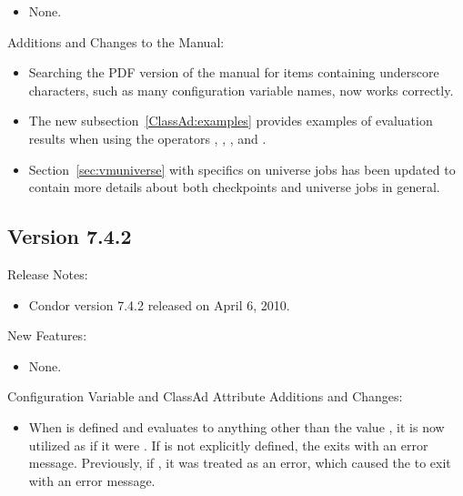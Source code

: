 \begin{itemize}

\item None.

\end{itemize}

\noindent Additions and Changes to the Manual:

\begin{itemize}

\item Searching the PDF version of the manual for items containing 
underscore characters, such as many configuration variable names,
now works correctly.

\item The new subsection~\ref{ClassAd:examples} provides examples of
evaluation results when using the operators \Expr{==}, ,
\Expr{!=}, and \Expr{=!=}.

\item Section~\ref{sec:vmuniverse} with specifics on 
universe jobs has been updated to contain more details about
both checkpoints and  universe jobs in general.

\end{itemize}


\subsection*{\label{sec:New-7-4-2}Version 7.4.2}

\noindent Release Notes:

\begin{itemize}

\item Condor version 7.4.2 released on April 6, 2010.

\end{itemize}


\noindent New Features:

\begin{itemize}

\item None.

\end{itemize}

\noindent Configuration Variable and ClassAd Attribute Additions and Changes:

\begin{itemize}

\item When  is defined and evaluates to anything
other than the value ,
it is now utilized as if it were .
If  is not explicitly defined,
the  exits with an error message.
Previously, if , it was treated as an error,
which caused the  to exit with an error message.

\end{itemize}

